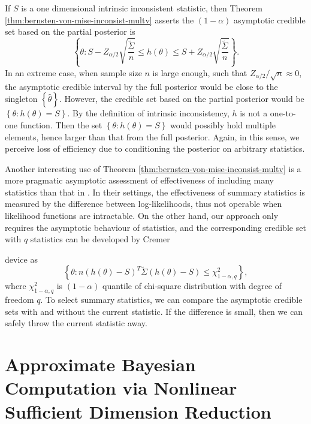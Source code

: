 If $S$ is a one dimensional intrinsic inconsistent statistic, then
Theorem \ref{thm:bernsten-von-mise-inconsist-multv} asserts the $\left(1-\alpha\right)$
asymptotic credible set based on {{} } {the
} partial posterior is 
\[
\left\{ \theta:S-Z_{\alpha/2}\sqrt{\frac{\tilde{\Sigma}}{n}}\le h\left(\theta\right)\le S+Z_{\alpha/2}\sqrt{\frac{\tilde{\Sigma}}{n}}\right\} .
\]
In an extreme case, when sample size $n$ is large enough, such that
$Z_{\alpha/2}/\sqrt{n}\approx0$, the asymptotic credible interval
by {{} } {the } full posterior would be
close to the singleton $\left\{ \hat{\theta}\right\} $. However,
the credible set based on {{} } {the } partial
posterior would be $\left\{ \theta:h\left(\theta\right)=S\right\} $.
By the definition of intrinsic inconsistency, $h$ is not a one-to-one
function. Then the set $\left\{ \theta:h\left(\theta\right)=S\right\} $
would possibly hold multiple elements, hence larger than that from {{}
} {the } full posterior. Again, in this sense, we
perceive loss of efficiency due to conditioning the posterior on arbitrary
statistics. 

Another interesting use of Theorem \ref{thm:bernsten-von-mise-inconsist-multv}
is a more pragmatic asymptotic assessment of effectiveness of including {{}
} {many} statistics than that in \citet{joyce2008approximately}.
In their settings, the effectiveness of summary statistics is measured
by the difference between log-likelihoods, thus not operable when
likelihood  {{} functions are} intractable. On the other
hand, our approach only {{} } {requires
}the asymptotic behaviour of statistics, and the corresponding credible
set with $q$ statistics can be developed by Cremer%

{} device as 
\[
\left\{ \theta:n\left(h\left(\theta\right)-S\right)^{T}\tilde{\Sigma}\left(h\left(\theta\right)-S\right)\le\chi_{1-\alpha,q}^{2}\right\} ,
\]
where $\chi_{1-\alpha,q}^{2}$ is $\left(1-\alpha\right)$ quantile
of chi-square distribution with degree of freedom $q$. To select
summary statistics, we can compare the asymptotic credible sets with
and without the current statistic. If the difference is small, then
we can safely throw the current statistic away. 


\section{\label{sec:abc-sdr}Approximate Bayesian Computation {{}
} {via } Nonlinear Sufficient Dimension Reduction}

